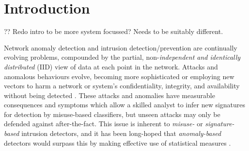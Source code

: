 \documentclass[10pt, times, conference, letterpaper]{IEEEtran}
\title{\mytitle{}}
\author{
Anonymous Giraffe,
Anonymous Badger,
Anonymous Ibex\\
Unnamed Department, Nowhere\\
\email{giraffe.a@unnamed.com}
}
\date{}
\begin{document}

\maketitle

\begin{abstract}
DDoS attacks still cause significant harm to online services to this day.
Their detection is difficult, because like many cybersecurity problems they \emph{evolve}: normal and attack patterns shift due to new protocols and applications.
Such evolution makes it difficult to apply machine learning techniques and defences.

Reinforcement learning (RL) agents manage and monitor system health in an online manner.
Unsupervised, online learning is a key part of overcoming this detection problem.
We present the architecture of a system designed to host such RL agents in a typical network.
Furthermore, we introduce two agents which advance the state-of-the-art in using RL for DDoS mitigation.
Both of these act per flow, in a protocol-agnostic manner for any network topology.
This is supported by an in-depth investigation of feature suitability and empirical evaluation.

Our results show the existence of flow features with high predictive power for bulk TCP and VoIP traffic.
We show that the new agents offer a significant increase in throughput of legitimate TCP traffic for many choices of host density.
\end{abstract}


\section{Introduction}
?? Redo intro to be more system focussed? Needs to be suitably different.

Network anomaly detection and intrusion detection/prevention are continually evolving problems, compounded by the partial, non-\emph{independent and identically distributed} (IID) view of data at each point in the network.
Attacks and anomalous behaviours evolve, becoming more sophisticated or employing new vectors to harm a network or system's confidentiality, integrity, and availability without being detected \cite{DBLP:journals/comsur/BhuyanBK14}.
These attacks and anomalies have measurable consequences and symptoms which allow a skilled analyst to infer new signatures for detection by misuse-based classifiers, but unseen attacks may only be defended against after-the-fact.
This issue is inherent to \emph{misuse-} or \emph{signature-based} intrusion detectors, and it has been long-hoped that \emph{anomaly-based} detectors would surpass this by making effective use of statistical measures \cite{DBLP:journals/comsur/BhuyanBK14}.
\end{document}

